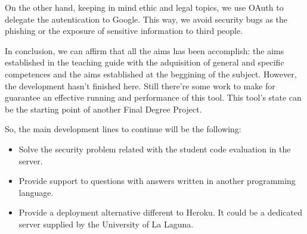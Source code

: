 
On the other hand, keeping in mind ethic and legal topics, we use OAuth to delegate the autentication to Google. This way, we avoid security bugs as the phishing or the exposure of sensitive 
information to third people.
\bigskip


In conclusion, we can affirm that all the aims has been accomplish: the aims established in the teaching guide with the adquisition of general and specific competences and the aims established at the
beggining of the subject. However, the development hasn't finished here. Still there're some work to make for guarantee an effective running and performance of this tool. This tool's state can be
the starting point of another Final Degree Project.
\bigskip


So, the main development lines to continue will be the following:

\begin{itemize}
  \item Solve the security problem related with the student code evaluation in the server.
  \item Provide support to questions with answers written in another programming language.
  \item Provide a deployment alternative different to Heroku. It could be a dedicated server supplied by the University of La Laguna.
\end{itemize}